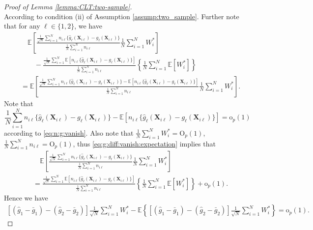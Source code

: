 \documentclass[12pt,letterpaper]{article}
\begin{document}
\begin{proof}[Proof of Lemma \ref{lemma:CLT:two-sample}]
\begin{equation}
\end{equation}
According to condition (ii) of Assumption \ref{assump:two_sample}. Further note that for any $\ell\in\{1,2\}$, we have 
\begin{equation}\label{eq:g:diff:vanish:expectation}
\begin{array}{rl}
&\quad\displaystyle\mathbb{E}\left[\frac{\frac{1}{\sqrt{N}}\sum_{i=1}^Nn_{i\ell}\{\hat{g}_{\ell}(\mathbf{X}_{i\ell})-g_{\ell}(\mathbf{X}_{i\ell})\}}{\frac{1}{N}\sum_{i=1}^Nn_{i\ell}}\frac{1}{N}\sum_{i=1}^NW_i^*\right]\\
&\displaystyle\quad\quad-\frac{\frac{1}{\sqrt{N}}\sum_{i=1}^N\mathbb{E}[n_{i\ell}\{\hat{g}_{\ell}(\mathbf{X}_{i\ell})-g_{\ell}(\mathbf{X}_{i\ell})\}]}{\frac{1}{N}\sum_{i=1}^Nn_{i\ell}}\left\{\frac{1}{N}\sum_{i=1}^N\mathbb{E}[W_i^*]\right\}\\
&\displaystyle=\mathbb{E}\left[\frac{\frac{1}{\sqrt{N}}\sum_{i=1}^Nn_{i\ell}\{\hat{g}_{\ell}(\mathbf{X}_{i\ell})-g_{\ell}(\mathbf{X}_{i\ell})\}-\mathbb{E}[n_{i\ell}\{\hat{g}_{\ell}(\mathbf{X}_{i\ell})-g_{\ell}(\mathbf{X}_{i\ell})\}]}{\frac{1}{N}\sum_{i=1}^Nn_{i\ell}}\frac{1}{N}\sum_{i=1}^NW_i^*\right].
\end{array}
\end{equation}
Note that 
$$\frac{1}{N}\sum_{i=1}^Nn_{i\ell}\{\hat{g}_{\ell}(\mathbf{X}_{i\ell})-g_{\ell}(\mathbf{X}_{i\ell})\}-\mathbb{E}[n_{i\ell}\{\hat{g}_{\ell}(\mathbf{X}_{i\ell})-g_{\ell}(\mathbf{X}_{i\ell})\}]=\mathrm{o}_p(1)$$ 
according to \eqref{eq:n:g:vanish}. Also note that $\frac{1}{N}\sum_{i=1}^NW_i^*=\mathrm{O}_p(1)$, $\frac{1}{N}\sum_{i=1}^Nn_{i\ell}=\mathrm{O}_p(1)$, thus \eqref{eq:g:diff:vanish:expectation} implies that 
$$\begin{array}{rl}
&\displaystyle\quad\mathbb{E}\left[\frac{\frac{1}{\sqrt{N}}\sum_{i=1}^Nn_{i\ell}\{\hat{g}_{\ell}(\mathbf{X}_{i\ell})-g_{\ell}(\mathbf{X}_{i\ell})\}}{\frac{1}{N}\sum_{i=1}^Nn_{i\ell}}\frac{1}{N}\sum_{i=1}^NW_i^*\right]\\
&\displaystyle=\frac{\frac{1}{\sqrt{N}}\sum_{i=1}^N\mathbb{E}[n_{i\ell}\{\hat{g}_{\ell}(\mathbf{X}_{i\ell})-g_{\ell}(\mathbf{X}_{i\ell})\}]}{\frac{1}{N}\sum_{i=1}^Nn_{i\ell}}\left\{\frac{1}{N}\sum_{i=1}^N\mathbb{E}[W_i^*]\right\}+\mathrm{o}_p(1).
\end{array}$$
Hence we have 
\begin{equation}\label{eq:g:w:vanish:1}
\begin{array}{rl}
\displaystyle\left[(\hat{g}_1-\bar{g}_1)-(\hat{g}_2-\bar{g}_2)\right]\frac{1}{\sqrt{N}}\sum_{i=1}^NW_i^*-\mathbb{E}\left\{\left[(\hat{g}_1-\bar{g}_1)-(\hat{g}_2-\bar{g}_2)\right]\frac{1}{\sqrt{N}}\sum_{i=1}^NW_i^*\right\}=\mathrm{o}_p(1). 

\end{array}
\end{equation}
\end{proof}
\end{document}
